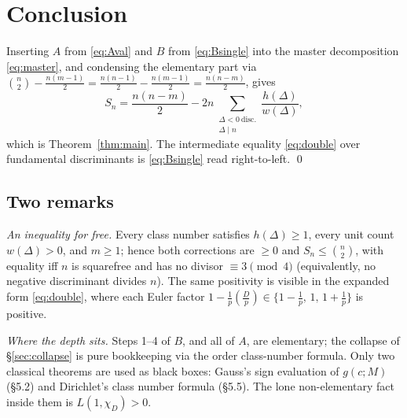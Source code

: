 \documentclass[11pt]{article}
\newcommand{\leg}[2]{\left(\frac{#1}{#2}\right)}
\begin{document}
\section{Conclusion}

Inserting $A$ from \eqref{eq:Aval} and $B$ from \eqref{eq:Bsingle} into the master decomposition
\eqref{eq:master}, and condensing the elementary part via
$\binom n2-\frac{n(m-1)}2=\frac{n(n-1)}2-\frac{n(m-1)}2=\frac{n(n-m)}2$, gives
\[
S_n=\frac{n(n-m)}{2}
-2n\sum_{\substack{\Delta<0\ \text{disc.}\\ \Delta\mid n}}\frac{h(\Delta)}{w(\Delta)},
\]
which is Theorem~\ref{thm:main}. The intermediate equality \eqref{eq:double} over fundamental discriminants is
\eqref{eq:Bsingle} read right-to-left. \qed

\subsection*{Two remarks}
\emph{An inequality for free.} Every class number satisfies $h(\Delta)\ge1$, every unit count $w(\Delta)>0$, and
$m\ge1$; hence both corrections are $\ge0$ and $S_n\le\binom n2$, with equality iff $n$ is squarefree and has no
divisor $\equiv3\pmod4$ (equivalently, no negative discriminant divides $n$). The same positivity is visible in
the expanded form \eqref{eq:double}, where each Euler factor
$1-\tfrac1p\leg Dp\in\{1-\tfrac1p,\,1,\,1+\tfrac1p\}$ is positive.

\emph{Where the depth sits.} Steps 1--4 of $B$, and all of $A$, are elementary; the collapse of
\S\ref{sec:collapse} is pure bookkeeping via the order class-number formula. Only two classical theorems are
used as black boxes: Gauss's sign evaluation of $g(c;M)$ (\S5.2) and Dirichlet's class number formula
(\S5.5). The lone non-elementary fact inside them is $L(1,\chi_D)>0$.
\end{document}

